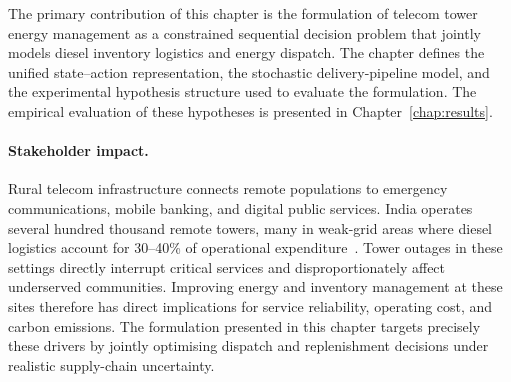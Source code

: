The primary contribution of this chapter is the formulation of telecom tower
energy management as a constrained sequential decision problem that jointly
models diesel inventory logistics and energy dispatch. The chapter defines the
unified state--action representation, the stochastic delivery-pipeline model,
and the experimental hypothesis structure used to evaluate the formulation.
The empirical evaluation of these hypotheses is presented in
Chapter~\ref{chap:results}.

\paragraph{Stakeholder impact.}
Rural telecom infrastructure connects remote populations to emergency
communications, mobile banking, and digital public services.  India operates
several hundred thousand remote towers, many in weak-grid areas where diesel
logistics account for 30--40\% of operational expenditure~\citep{gsma2025b,trai2024}.
Tower outages in these settings directly interrupt critical services and
disproportionately affect underserved communities.  Improving energy and
inventory management at these sites therefore has direct implications for
service reliability, operating cost, and carbon emissions.  The formulation
presented in this chapter targets precisely these drivers by jointly
optimising dispatch and replenishment decisions under realistic supply-chain
uncertainty.